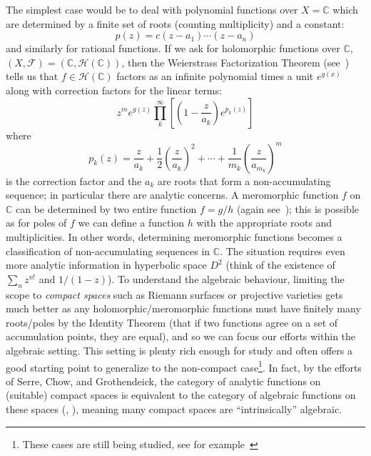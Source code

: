 \documentclass{book}
\newcommand{\C}{{\mathbb{C}}}
\newcommand{\CM}{{\mathcal{M}}}
\newcommand{\CF}{{\mathcal{F}}}
\newcommand{\CH}{{\mathcal{H}}}
\newcommand{\CO}{{\mathcal{O}}}
\begin{document}
The simplest case would be to deal with polynomial functions over $X = \C$ which are determined by a finite
set of roots (counting multiplicity) and a constant:
\[
  p(z) = c(z-a_1)\cdots (z-a_n)
\]
and similarly for rational functions.
If we ask for holomorphic
functions over $\C$, $(X,\CF) = (\C, \CH(\C))$, then the Weierstrass Factorization Theorem
(see~\cite[section~4.2]{NateComplexAnalysis}) tells us that $f \in \CH(\C)$ factors as an infinite polynomial
times a unit $e^{g(x)}$ along with correction factors for the linear terms:
\[
  z^m e^{g(z)}\prod_k^\infty \left[ \left( 1- \frac{z}{a_k} \right)e^{p_k(z)} \right]
\]
where
\[
  p_k(z) =  \frac{z}{a_k} + \frac{1}{2} \left( \frac{z}{a_k} \right)^2 + \cdots + \frac{1}{m_k} \left( \frac{z}{a_{m_k}} \right)^m
\]
is the correction factor and the $a_k$ are roots that form a non-accumulating sequence; in particular there are analytic concerns.
A meromorphic function $f$ on $\C$ can be determined by two entire function $f = g/h$ (again
see~\cite[section~4.2]{NateComplexAnalysis}); this is possible as for poles of $f$ we can define a function $h$ with the
appropriate roots and multiplicities. In other words, determining meromorphic functions becomes
a classification of non-accumulating sequences in $\C$. The situation requires even more analytic information in hyperbolic
space $D^2$ (think of the existence of $\sum_n z^{n!}$ and $1/(1-z)$). To understand the algebraic behaviour, limiting the scope to
\emph{compact spaces} such as Riemann surfaces or projective varieties gets much better as any holomorphic/meromorphic
functions must have finitely many roots/poles by the Identity Theorem (that if two functions agree on a set
of accumulation points, they are equal), and so we can focus our efforts within the algebraic setting. This
setting is plenty rich enough for study and often offers a good starting point to generalize to the
non-compact case\footnote{These cases are still being studied, see for
example~\cite{montpletRiemannRochIsometriesNoncompact2016}}. In fact, by the efforts of Serre, Chow, and Grothendeick, the category of analytic
functions on (suitable) compact spaces is equivalent to the category of algebraic functions on these spaces
(\cite{hallGAGATheorems2022}, \cite{chowCompactComplexAnalytic1949}),
meaning many compact spaces are ``intrinsically'' algebraic.
\end{document}
